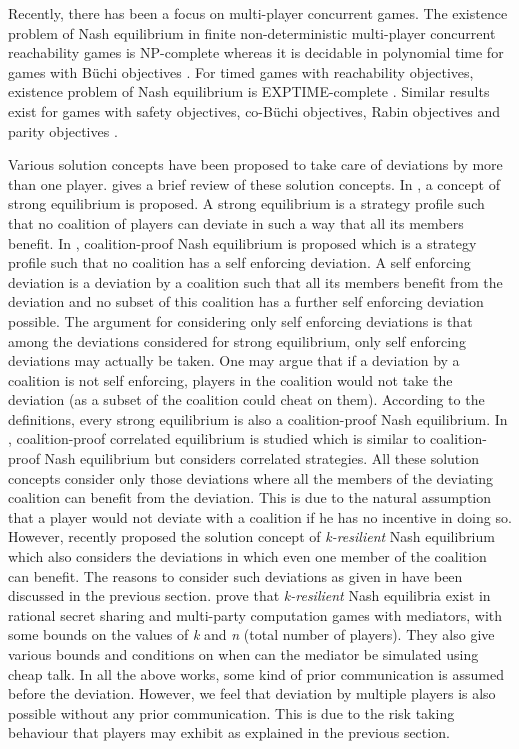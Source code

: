 Recently, there has been a focus on multi-player concurrent games. The existence problem of Nash equilibrium in finite non-deterministic multi-player concurrent reachability games is NP-complete \cite{BBM-concur10,BBM-report,Romain-phd} whereas it is decidable in polynomial time for games with B{\"u}chi objectives \cite{BBMU-fsttcs11,Romain-phd}. For timed games with reachability objectives, existence problem of Nash equilibrium is EXPTIME-complete \cite{BBM-concur10,BBM-report,Romain-phd}. Similar results exist for games with safety objectives, co-B{\"u}chi objectives, Rabin objectives and parity objectives \cite{Romain-phd}.
 
Various solution concepts have been proposed to take care of deviations by more than one player. \citet{Halpern-2008,Halpern-2011} gives a brief review of these solution concepts. In \cite{Aumann-59}, a concept of strong equilibrium is proposed. A strong equilibrium is a strategy profile such that no coalition of players can deviate in such a way that all its members benefit. In \cite{Bernheim-1987}, coalition-proof Nash equilibrium is proposed which is a strategy profile such that no coalition has a self enforcing deviation. A self enforcing deviation is a deviation by a coalition such that all its members benefit from the deviation and no subset of this coalition has a further self enforcing deviation possible. The argument for considering only self enforcing deviations is that among the deviations considered for strong equilibrium, only self enforcing deviations may actually be taken. One may argue that if a deviation by a coalition is not self enforcing, players in the coalition would not take the deviation (as a subset of the coalition could cheat on them). According to the definitions, every strong equilibrium is also a coalition-proof Nash equilibrium. In \cite{Moreno-1996}, coalition-proof correlated equilibrium is studied which is similar to coalition-proof Nash equilibrium but considers correlated strategies. All these solution concepts consider only those deviations where all the members of the deviating coalition can benefit from the deviation. This is due to the natural assumption that a player would not deviate with a coalition if he has no incentive in doing so. However, recently \citet{Abraham-2006,Abraham-2008} proposed the solution concept of \textit{k-resilient} Nash equilibrium which also considers the deviations in which even one member of the coalition can benefit. The reasons to consider such deviations as given in \cite{Abraham-2006} have been discussed in the previous section. \citet{Abraham-2006,Abraham-2008} prove that \textit{k-resilient} Nash equilibria exist in rational secret sharing and multi-party computation games with mediators, with some bounds on the values of \textit{k} and \textit{n} (total number of players). They also give various bounds and conditions on when can the mediator be simulated using cheap talk. In all the above works, some kind of prior communication is assumed before the deviation. However, we feel that deviation by multiple players is also possible without any prior communication. This is due to the risk taking behaviour that players may exhibit as explained in the previous section.
 
